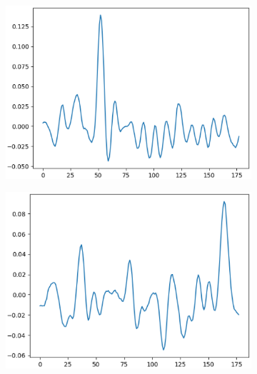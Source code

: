 \documentclass[12pt]{article}
\begin{document}
\begin{figure}
\begin{subfigure}{.5\textwidth}
  \centering
  \includegraphics[width=.8\linewidth]{figures/stack_50_50_dropout_elu/weights_neuron_0.eps}
\end{subfigure}%
\begin{subfigure}{.5\textwidth}
  \centering
  \includegraphics[width=.8\linewidth]{figures/stack_50_50_dropout_elu/weights_neuron_1.eps}
\end{subfigure}


\end{figure}
\end{document}
